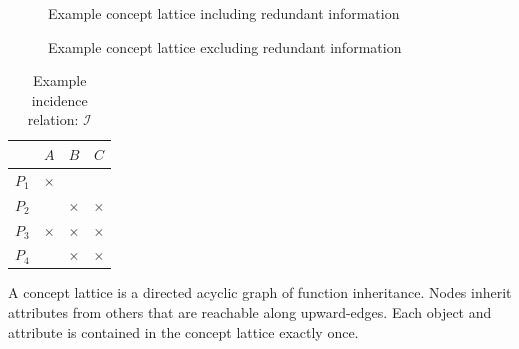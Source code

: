 \documentclass[a4paper, final, diplominf]{zih-template}
\begin{document}
\begin{figure}[tb]
	\centering
	
	\caption{Example concept lattice including redundant information}
	\label{fig:concept-lattice-example-redundant}
\end{figure}
\begin{figure}[tb]
	\centering
	
	\caption{Example concept lattice excluding redundant information}
	\label{fig:concept-lattice-example-not-redundant}
\end{figure}
\begin{table}[tb]
	\centering
	\caption{Example incidence relation: $\mathcal{I}$}
	\vspace{0.2cm}
	\begin{tabular}{r | c c c}
			  & $A$      & $B$      & $C$      \\
		\hline
		$P_1$ & $\times$ &          &          \\
		$P_2$ &          & $\times$ & $\times$ \\
		$P_3$ & $\times$ & $\times$ & $\times$ \\
		$P_4$ &          & $\times$ & $\times$ \\
	\end{tabular}
	\label{tab:formal-context-example}
\end{table}

A concept lattice is a directed acyclic graph of function inheritance.
Nodes inherit attributes from others that are reachable along upward-edges.
Each object and attribute is contained in the concept lattice exactly once.
\end{document}
